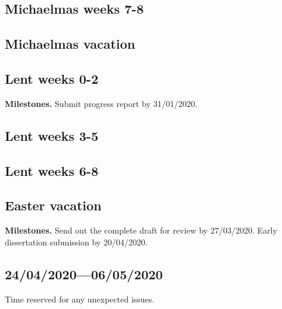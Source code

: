 \documentclass[12pt,a4paper,twoside]{article}
\begin{document}
\subsection*{Michaelmas weeks 7-8}

\subsection*{Michaelmas vacation}

\subsection*{Lent weeks 0-2}
 
\textbf{Milestones.} Submit progress report by 31/01/2020.

\subsection*{Lent weeks 3-5} 

\subsection*{Lent weeks 6-8}

\subsection*{Easter vacation}

\textbf{Milestones.} Send out the complete draft for review by 27/03/2020. Early dissertation submission by 20/04/2020.

\subsection*{24/04/2020—06/05/2020}
 Time reserved for any unexpected issues.



\end{document}
